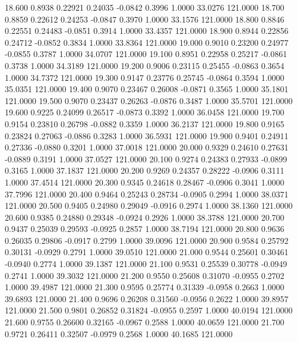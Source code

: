   18.600   0.8938   0.22921   0.24035  -0.0842   0.3996   1.0000  33.0276 121.0000
  18.700   0.8859   0.22612   0.24253  -0.0847   0.3970   1.0000  33.1576 121.0000
  18.800   0.8846   0.22551   0.24483  -0.0851   0.3914   1.0000  33.4357 121.0000
  18.900   0.8944   0.22856   0.24712  -0.0852   0.3834   1.0000  33.8364 121.0000
  19.000   0.9010   0.23200   0.24977  -0.0855   0.3787   1.0000  34.0707 121.0000
  19.100   0.8951   0.22958   0.25217  -0.0861   0.3738   1.0000  34.3189 121.0000
  19.200   0.9006   0.23115   0.25455  -0.0863   0.3654   1.0000  34.7372 121.0000
  19.300   0.9147   0.23776   0.25745  -0.0864   0.3594   1.0000  35.0351 121.0000
  19.400   0.9070   0.23467   0.26008  -0.0871   0.3565   1.0000  35.1801 121.0000
  19.500   0.9070   0.23437   0.26263  -0.0876   0.3487   1.0000  35.5701 121.0000
  19.600   0.9225   0.24099   0.26517  -0.0873   0.3392   1.0000  36.0458 121.0000
  19.700   0.9154   0.23810   0.26798  -0.0882   0.3359   1.0000  36.2137 121.0000
  19.800   0.9165   0.23824   0.27063  -0.0886   0.3283   1.0000  36.5931 121.0000
  19.900   0.9401   0.24911   0.27336  -0.0880   0.3201   1.0000  37.0018 121.0000
  20.000   0.9329   0.24610   0.27631  -0.0889   0.3191   1.0000  37.0527 121.0000
  20.100   0.9274   0.24383   0.27933  -0.0899   0.3165   1.0000  37.1837 121.0000
  20.200   0.9269   0.24357   0.28222  -0.0906   0.3111   1.0000  37.4514 121.0000
  20.300   0.9345   0.24618   0.28467  -0.0906   0.3041   1.0000  37.7996 121.0000
  20.400   0.9464   0.25243   0.28734  -0.0905   0.2994   1.0000  38.0371 121.0000
  20.500   0.9405   0.24980   0.29049  -0.0916   0.2974   1.0000  38.1360 121.0000
  20.600   0.9385   0.24880   0.29348  -0.0924   0.2926   1.0000  38.3788 121.0000
  20.700   0.9437   0.25039   0.29593  -0.0925   0.2857   1.0000  38.7194 121.0000
  20.800   0.9636   0.26035   0.29806  -0.0917   0.2799   1.0000  39.0096 121.0000
  20.900   0.9584   0.25792   0.30131  -0.0929   0.2791   1.0000  39.0510 121.0000
  21.000   0.9544   0.25601   0.30461  -0.0940   0.2774   1.0000  39.1387 121.0000
  21.100   0.9531   0.25539   0.30778  -0.0949   0.2741   1.0000  39.3032 121.0000
  21.200   0.9550   0.25608   0.31070  -0.0955   0.2702   1.0000  39.4987 121.0000
  21.300   0.9595   0.25774   0.31339  -0.0958   0.2663   1.0000  39.6893 121.0000
  21.400   0.9696   0.26208   0.31560  -0.0956   0.2622   1.0000  39.8957 121.0000
  21.500   0.9801   0.26852   0.31824  -0.0955   0.2597   1.0000  40.0194 121.0000
  21.600   0.9755   0.26600   0.32165  -0.0967   0.2588   1.0000  40.0659 121.0000
  21.700   0.9721   0.26411   0.32507  -0.0979   0.2568   1.0000  40.1685 121.0000
